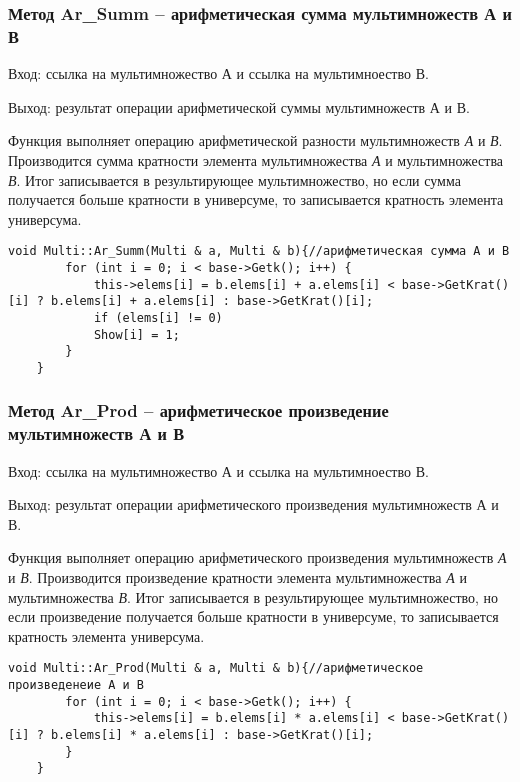 \documentclass[10pt,a4paper,final]{article} %
\begin{document}
\subsubsection {Метод Ar\_Summ -- арифметическая  сумма мультимножеств А и В}
\par Вход: ссылка на мультимножество А и ссылка на мультимноество В. 
 \par Выход: результат операции арифметической суммы мультимножеств А и В.
\par Функция выполняет операцию арифметической разности мультимножеств \textit{А} и \textit{В}. Производится сумма кратности элемента мультимножества \textit{А} и мультимножества \textit{В}. Итог записывается в результирующее мультимножество, но если сумма получается больше кратности в универсуме, то записывается кратность элемента универсума.
\begin{lstlisting}[caption={Метод Ar\_Summ}]
	void Multi::Ar_Summ(Multi & a, Multi & b){//арифметическая сумма А и В
		for (int i = 0; i < base->Getk(); i++) {
			this->elems[i] = b.elems[i] + a.elems[i] < base->GetKrat()[i] ? b.elems[i] + a.elems[i] : base->GetKrat()[i];
			if (elems[i] != 0)
			Show[i] = 1;
		}
	}
\end{lstlisting}


 \subsubsection {Метод Ar\_Prod -- арифметическое произведение мультимножеств А и В}
\par Вход: ссылка на мультимножество А и ссылка на мультимноество В. 
 \par Выход: результат операции арифметического произведения мультимножеств А и В.
\par Функция выполняет операцию арифметического произведения мультимножеств \textit{А} и \textit{В}. Производится произведение кратности элемента мультимножества \textit{А} и мультимножества \textit{В}. Итог записывается в результирующее мультимножество, но если произведение получается больше кратности в универсуме, то записывается кратность элемента универсума.
\begin{lstlisting}[caption={Метод Ar\_Prod}]
	void Multi::Ar_Prod(Multi & a, Multi & b){//арифметическое произведенеие А и В
		for (int i = 0; i < base->Getk(); i++) {
			this->elems[i] = b.elems[i] * a.elems[i] < base->GetKrat()[i] ? b.elems[i] * a.elems[i] : base->GetKrat()[i];
		}
	}
\end{lstlisting}
\end{document}
